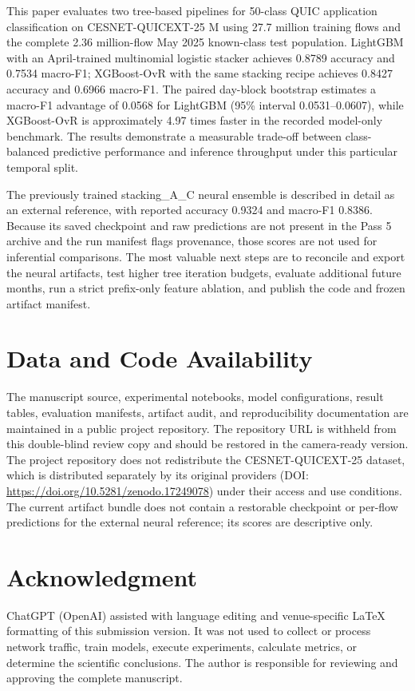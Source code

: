 \documentclass[conference]{IEEEtran}
\begin{document}
This paper evaluates two tree-based pipelines for 50-class QUIC application classification on CESNET-QUICEXT-25 M using 27.7 million training flows and the complete 2.36 million-flow May 2025 known-class test population. LightGBM with an April-trained multinomial logistic stacker achieves 0.8789 accuracy and 0.7534 macro-F1; XGBoost-OvR with the same stacking recipe achieves 0.8427 accuracy and 0.6966 macro-F1. The paired day-block bootstrap estimates a macro-F1 advantage of 0.0568 for LightGBM (95\% interval 0.0531--0.0607), while XGBoost-OvR is approximately 4.97 times faster in the recorded model-only benchmark. The results demonstrate a measurable trade-off between class-balanced predictive performance and inference throughput under this particular temporal split.

The previously trained stacking\_A\_C neural ensemble is described in detail as an external reference, with reported accuracy 0.9324 and macro-F1 0.8386. Because its saved checkpoint and raw predictions are not present in the Pass 5 archive and the run manifest flags provenance, those scores are not used for inferential comparisons. The most valuable next steps are to reconcile and export the neural artifacts, test higher tree iteration budgets, evaluate additional future months, run a strict prefix-only feature ablation, and publish the code and frozen artifact manifest.

\section*{Data and Code Availability}

The manuscript source, experimental notebooks, model configurations, result tables, evaluation manifests, artifact audit, and reproducibility documentation are maintained in a public project repository. The repository URL is withheld from this double-blind review copy and should be restored in the camera-ready version. The project repository does not redistribute the CESNET-QUICEXT-25 dataset, which is distributed separately by its original providers (DOI: \url{https://doi.org/10.5281/zenodo.17249078}) under their access and use conditions. The current artifact bundle does not contain a restorable checkpoint or per-flow predictions for the external neural reference; its scores are descriptive only.

\section*{Acknowledgment}
ChatGPT (OpenAI) assisted with language editing and venue-specific LaTeX formatting of this submission version. It was not used to collect or process network traffic, train models, execute experiments, calculate metrics, or determine the scientific conclusions. The author is responsible for reviewing and approving the complete manuscript.



\end{document}
